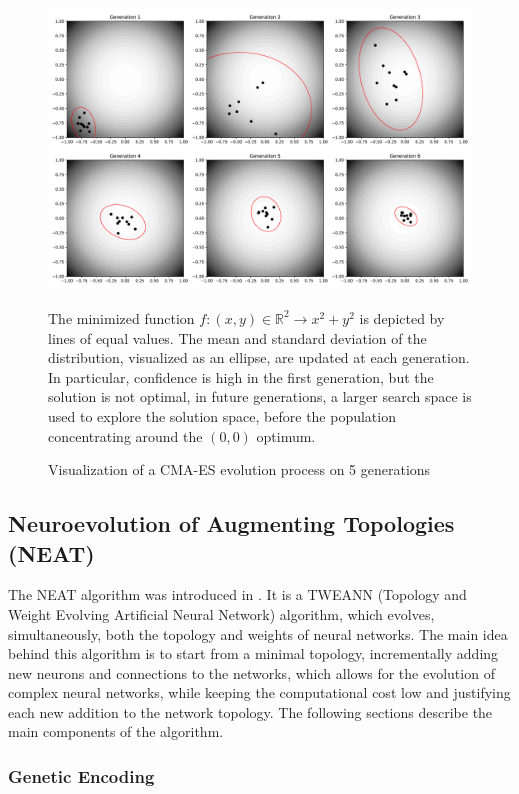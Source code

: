 \begin{figure}
    \centering
    \includegraphics[width=\textwidth]{Pictures/cmaes}
    \caption{Visualization of a CMA-ES evolution process on 5 generations}
    {The minimized function $f: (x,y) \in \mathds{R}^2 \to x^2 + y^2$ is depicted by lines of equal values. The mean and standard deviation of the distribution, visualized as an ellipse,
    are updated at each generation. In particular, confidence is high in the first generation, but the solution is not optimal, in future generations, a larger
    search space is used to explore the solution space, before the population concentrating around the $(0,0)$ optimum.}

    \label{fig:cmaes_visualization}
\end{figure}

\subsection{Neuroevolution of Augmenting Topologies (NEAT)}

The NEAT algorithm was introduced in \cite{neat}. It is a TWEANN (Topology and Weight Evolving Artificial Neural Network) algorithm, which evolves, simultaneously,  both
the topology and weights of neural networks. The main idea behind this algorithm is to start from a minimal topology, incrementally adding new neurons and connections to
the networks, which allows for the evolution of complex neural networks, while keeping the computational cost low and justifying each new addition to the network topology.
The following sections describe the main components of the algorithm.

\subsubsection{Genetic Encoding}

